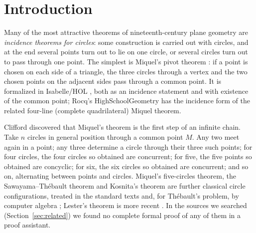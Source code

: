 \documentclass[11pt]{article}
\theoremstyle{definition}
\theoremstyle{remark}
\begin{document}
\section{Introduction}

Many of the most attractive theorems of nineteenth-century plane geometry are \emph{incidence
theorems for circles}: some construction is carried out with circles, and at the end several points
turn out to lie on one circle, or several circles turn out to pass through one point. The simplest is
Miquel's pivot theorem \cite{miquel1838}: if a point is chosen on each side of a triangle, the three
circles through a vertex and the two chosen points on the adjacent sides pass through a common
point. It is formalized in Isabelle/HOL \cite{afpmiquel}, both as an incidence statement and with
existence of the common point; Rocq's HighSchoolGeometry \cite{hsgeometry} has the incidence form of
the related four-line (complete quadrilateral) Miquel theorem.

Clifford \cite{clifford1871} discovered that Miquel's theorem is the first step of an infinite chain.
Take $n$ circles in general position through a common point $M$. Any two meet again in a point;
any three determine a circle through their three such points; for four circles, the four circles so
obtained are concurrent; for five, the five points so obtained are concyclic; for six, the six circles
so obtained are concurrent; and so on, alternating between points and circles. Miquel's five-circles
theorem, the Sawayama--Th\'ebault theorem and Kosnita's theorem are further classical circle
configurations, treated in the standard texts \cite{johnson1929,pedoe1970} and, for Th\'ebault's
problem, by computer algebra \cite{chou1988}; Lester's theorem is more recent \cite{lester1997,yiu2010}.
In the sources we searched (Section~\ref{sec:related}) we found no complete formal proof of any of them
in a proof assistant.
\end{document}
